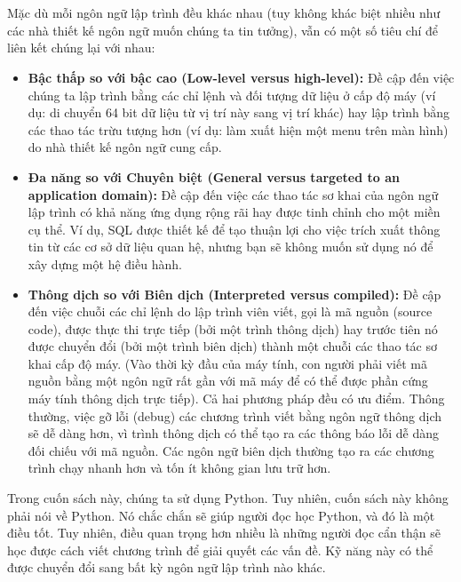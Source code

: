 \newpage
\chapter*{}

\noindent \indent Mặc dù mỗi ngôn ngữ lập trình đều khác nhau (tuy không khác biệt nhiều như các nhà thiết kế ngôn ngữ muốn chúng ta tin tưởng), vẫn có một số tiêu chí để liên kết chúng lại với nhau:

\begin{itemize}
    \item \textbf{Bậc thấp so với bậc cao (Low-level versus high-level):} Đề cập đến việc chúng ta lập trình bằng các chỉ lệnh và đối tượng dữ liệu ở cấp độ máy (ví dụ: di chuyển 64 bit dữ liệu từ vị trí này sang vị trí khác) hay lập trình bằng các thao tác trừu tượng hơn (ví dụ: làm xuất hiện một menu trên màn hình) do nhà thiết kế ngôn ngữ cung cấp.

    \item \textbf{Đa năng so với Chuyên biệt (General versus targeted to an application domain):} Đề cập đến việc các thao tác sơ khai của ngôn ngữ lập trình có khả năng ứng dụng rộng rãi hay được tinh chỉnh cho một miền cụ thể. Ví dụ, SQL được thiết kế để tạo thuận lợi cho việc trích xuất thông tin từ các cơ sở dữ liệu quan hệ, nhưng bạn sẽ không muốn sử dụng nó để xây dựng một hệ điều hành.

    \item \textbf{Thông dịch so với Biên dịch (Interpreted versus compiled):} Đề cập đến việc chuỗi các chỉ lệnh do lập trình viên viết, gọi là mã nguồn (source code), được thực thi trực tiếp (bởi một trình thông dịch) hay trước tiên nó được chuyển đổi (bởi một trình biên dịch) thành một chuỗi các thao tác sơ khai cấp độ máy. (Vào thời kỳ đầu của máy tính, con người phải viết mã nguồn bằng một ngôn ngữ rất gần với mã máy để có thể được phần cứng máy tính thông dịch trực tiếp). Cả hai phương pháp đều có ưu điểm. Thông thường, việc gỡ lỗi (debug) các chương trình viết bằng ngôn ngữ thông dịch sẽ dễ dàng hơn, vì trình thông dịch có thể tạo ra các thông báo lỗi dễ dàng đối chiếu với mã nguồn. Các ngôn ngữ biên dịch thường tạo ra các chương trình chạy nhanh hơn và tốn ít không gian lưu trữ hơn.
\end{itemize}

Trong cuốn sách này, chúng ta sử dụng Python. Tuy nhiên, cuốn sách này không phải nói về Python. Nó chắc chắn sẽ giúp người đọc học Python, và đó là một điều tốt. Tuy nhiên, điều quan trọng hơn nhiều là những người đọc cẩn thận sẽ học được cách viết chương trình để giải quyết các vấn đề. Kỹ năng này có thể được chuyển đổi sang bất kỳ ngôn ngữ lập trình nào khác.

